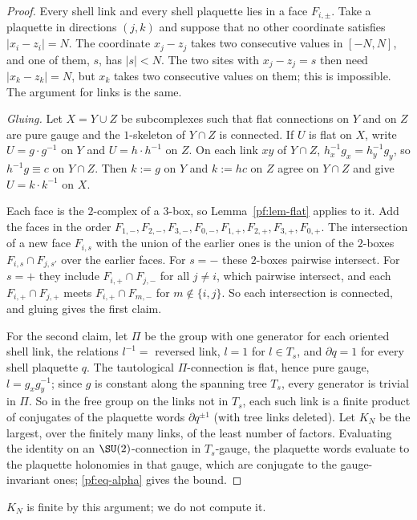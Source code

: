 \begin{proof}
Every shell link and every shell plaquette lies in a face $F_{i,\pm}$. Take a plaquette in directions $(j,k)$ and suppose that no other coordinate satisfies $|x_i-z_i|=N$. The coordinate $x_j-z_j$ takes two consecutive values in $[-N,N]$, and one of them, $s$, has $|s|<N$. The two sites with $x_j-z_j=s$ then need $|x_k-z_k|=N$, but $x_k$ takes two consecutive values on them; this is impossible. The argument for links is the same.

\emph{Gluing.} Let $X=Y\cup Z$ be subcomplexes such that flat connections on $Y$ and on $Z$ are pure gauge and the $1$-skeleton of $Y\cap Z$ is connected. If $U$ is flat on $X$, write $U=g\cdot g^{-1}$ on $Y$ and $U=h\cdot h^{-1}$ on $Z$. On each link $xy$ of $Y\cap Z$, $h_x^{-1}g_x=h_y^{-1}g_y$, so $h^{-1}g\equiv c$ on $Y\cap Z$. Then $k:=g$ on $Y$ and $k:=hc$ on $Z$ agree on $Y\cap Z$ and give $U=k\cdot k^{-1}$ on $X$.

Each face is the $2$-complex of a $3$-box, so Lemma~\ref{pf:lem-flat} applies to it. Add the faces in the order $F_{1,-},F_{2,-},F_{3,-},F_{0,-},F_{1,+},F_{2,+},F_{3,+},F_{0,+}$. The intersection of a new face $F_{i,s}$ with the union of the earlier ones is the union of the $2$-boxes $F_{i,s}\cap F_{j,s'}$ over the earlier faces. For $s=-$ these $2$-boxes pairwise intersect. For $s=+$ they include $F_{i,+}\cap F_{j,-}$ for all $j\ne i$, which pairwise intersect, and each $F_{i,+}\cap F_{j,+}$ meets $F_{i,+}\cap F_{m,-}$ for $m\notin\{i,j\}$. So each intersection is connected, and gluing gives the first claim.

For the second claim, let $\Pi$ be the group with one generator for each oriented shell link, the relations $l^{-1}=$ reversed link, $l=1$ for $l\in T_s$, and $\partial q=1$ for every shell plaquette $q$. The tautological $\Pi$-connection is flat, hence pure gauge, $l=g_xg_y^{-1}$; since $g$ is constant along the spanning tree $T_s$, every generator is trivial in $\Pi$. So in the free group on the links not in $T_s$, each such link is a finite product of conjugates of the plaquette words $\partial q^{\pm1}$ (with tree links deleted). Let $K_N$ be the largest, over the finitely many links, of the least number of factors. Evaluating the identity on an $\SU(2)$-connection in $T_s$-gauge, the plaquette words evaluate to the plaquette holonomies in that gauge, which are conjugate to the gauge-invariant ones; \eqref{pf:eq-alpha} gives the bound.
\end{proof}

$K_N$ is finite by this argument; we do not compute it.

